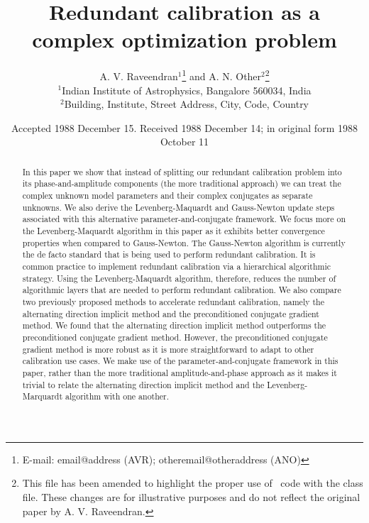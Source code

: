 \documentclass[useAMS,usenatbib]{mn2e}
\title[Unknown]{Redundant calibration as a complex optimization problem}
\author[A. V. Raveendran and A. N. Other]{A. V. Raveendran$^{1}$\thanks{E-mail:
email@address (AVR); otheremail@otheraddress (ANO)} and A. N.
Other$^{2}$\footnotemark[1]\thanks{This file has been amended to
highlight the proper use of \LaTeXe\ code with the class file.
These changes are for illustrative purposes and do not reflect the
original paper by A. V. Raveendran.}\\
$^{1}$Indian Institute of Astrophysics, Bangalore 560034, India\\
$^{2}$Building, Institute, Street Address, City, Code, Country}
\begin{document}
\date{Accepted 1988 December 15. Received 1988 December 14; in original form 1988 October 11}

\pagerange{\pageref{firstpage}--\pageref{lastpage}} 

\maketitle

\label{firstpage}

\begin{abstract}
In this paper we show that instead of splitting our redundant calibration problem into its phase-and-amplitude components (the more traditional approach) we can treat the complex unknown model parameters and their complex conjugates as separate unknowns. 
We also derive the Levenberg-Maquardt and Gauss-Newton update steps associated with this alternative parameter-and-conjugate framework.
We focus more on the Levenberg-Maquardt algorithm in this paper as it exhibits better convergence properties when compared to Gauss-Newton.
The Gauss-Newton algorithm is currently the de facto standard that is being used to perform redundant calibration.
It is common practice to implement redundant calibration via a hierarchical algorithmic strategy. Using the Levenberg-Maquardt algorithm, therefore, reduces the number of algorithmic layers that are needed to perform redundant calibration.
We also compare two previously proposed methods to accelerate redundant calibration, namely the alternating direction implicit method and the preconditioned conjugate gradient method. We found that the alternating 
direction implicit method outperforms the preconditioned conjugate gradient method. However, the preconditioned conjugate gradient method is more robust as it is more straightforward to adapt to other calibration use cases. 
We make use of the parameter-and-conjugate framework in this paper, rather than the more traditional amplitude-and-phase approach as it makes it trivial to relate the alternating direction implicit method 
and the Levenberg-Marquardt algorithm with one another.
\end{abstract}

\end{document}
